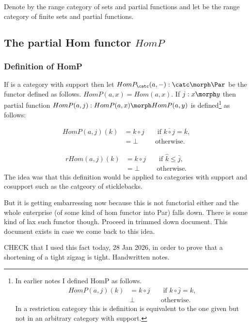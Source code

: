 Denote by \Par the range category of sets and partial functions
 and let
\FinPar be the range category of finite sets and partial functions. 

\subsection{The partial Hom functor $HomP$}

\subsubsection{Definition of HomP}
If \catcw is a category with support then 
let $HomP_\catc(a,-): \catc \morph \Par$ be the  functor
defined as follows. $HomP(a,x)=Hom(a,x)$.
If $j: x \morph y$ then partial function $HomP(a,j): HomP(a,x) \morph HomP(a,y)$
is defined\footnote{
In earlier notes I defined HomP as follows.
\begin{align*}
HomP(a,j)(k) &= k \circ j &&\mbox{ if $k \circ \bar{j} = k$,} \\
             &\bot        && \mbox{otherwise.}
\end{align*}
In a restriction category this is definition is equivalent to the one given but not in an arbitrary category with support.
} as follows:
\begin{oldtt}
\begin{align*}
HomP(a,j)(k) &= k \circ j  &&\mbox{ if $\overline{k \circ j} = \overline{k}$,} \\
             &=\bot        && \mbox{otherwise.}
\end{align*}
\end{oldtt}
\begin{newtt}
\begin{align*}
rHom(a,j)(k) &= k \circ j  &&\mbox{ if $\hat{k} \leq  \bar{j}$,} \\
             &=\bot        && \mbox{otherwise.}
\end{align*}
The idea was that this definition would be applied to categories with support and cosupport such as the catgeory of sticklebacks. 
\begin{worktt}
But it is getting embarressing now because this is not functorial either and the whole enterprise (of some kind of hom functor into Par) falls down. There is some kind of lax such functor though. Proceed in trimmed down document. This document exists in case we come back to this idea. 
\end{worktt}
\end{newtt}
\begin{notebox}
CHECK that  I used this fact today, 28 Jan 2026, in order to prove
that a shortening of a tight zigzag is tight. Handwritten notes.
\end{notebox}


